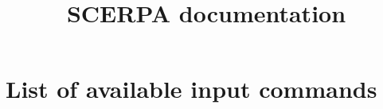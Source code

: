 \documentclass[10pt,a4paper]{article}
\title{SCERPA documentation}
\begin{document}
\maketitle
\section*{List of available input commands}
\end{document}
